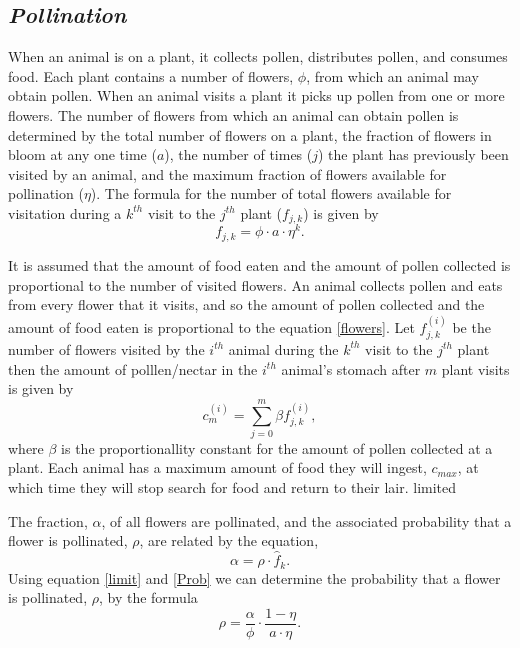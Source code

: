 \subsection{\emph{Pollination}}
  When an animal is on a plant, it collects pollen, distributes pollen, and consumes food. Each
  plant contains a number of flowers, $\phi$, from which an animal may obtain pollen. When an animal
  visits a plant it picks up pollen from one or more flowers. The number of flowers from which an
  animal can obtain pollen is determined by the total number of flowers on a plant, the fraction of
  flowers in bloom at any one time ($a$), the number of times ($j$) the plant has previously been
  visited by an animal, and the maximum fraction of flowers available for pollination ($\eta$). The
  formula for the number of total flowers available for visitation during a $k^{th}$ visit to the
  $j^{th}$ plant ($f_{j,k}$) is given by
  \begin{equation}\label{flowers}
    f_{j,k} = \phi \cdot a \cdot \eta^k.
  \end{equation}

  It is assumed that the amount of food eaten and the amount of pollen collected is proportional to
  the number of visited flowers. An animal collects pollen and eats from every flower that it
  visits, and so the amount of pollen collected and the amount of food eaten is proportional to the
  equation \eqref{flowers}. Let $f^{\left(i\right)}_{j,k}$ be the number of flowers visited by the
  $i^{th}$ animal during the $k^{th}$ visit to the $j^{th}$ plant then the amount of polllen/nectar
  in the $i^{th}$ animal's stomach after $m$ plant visits is given by
  \begin{equation}
    c^{\left(i\right)}_m = \sum_{j=0}^{m} \beta f^{\left(i\right)}_{j,k},
    \label{limit}
  \end{equation}
  where $\beta$ is the proportionallity constant for the amount of pollen collected at a plant.
  Each animal has a maximum amount of food they will ingest, $c_{max}$, at which time they will stop
  search for food and return to their lair. %
  limited

  The fraction, $\alpha$, of all flowers are pollinated, and the associated probability that a
  flower is pollinated, $\rho$, are related by the equation,
  \begin{equation} \label{Prob}
    \alpha = \rho \cdot \hat{f}_k.
  \end{equation}
  Using equation \eqref{limit} and \eqref{Prob} we can determine the probability that a flower is
  pollinated, $\rho$, by the formula
  \[
    \rho = \frac{\alpha}{\phi} \cdot \frac{1 - \eta}{a \cdot \eta}.
  \]

